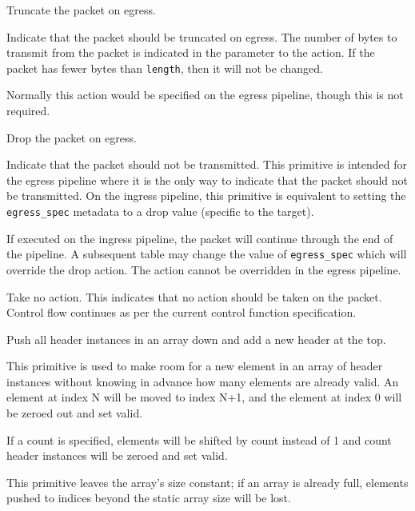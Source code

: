 \documentclass[12pt]{article}
\begin{document}

{ %
Truncate the packet on egress.
}
{ %
}
{ %
Indicate that the packet should be truncated on egress.  The number of bytes 
to transmit from the packet is indicated in the parameter to the action.  If 
the packet has fewer bytes than \texttt{length}, then it will not be changed.

Normally this action would be specified on the egress pipeline, though this 
is not required.
}


{ %
Drop the packet on egress.
}
{ %
}
{ %
Indicate that the packet should not be transmitted. This primitive is intended 
for the egress pipeline where it is the only way to indicate that the packet 
should not be transmitted. On the ingress pipeline, this primitive is equivalent 
to setting the \texttt{egress_spec} metadata to a drop value (specific to the target). 


If executed on the ingress pipeline, the packet will continue through the 
end of the pipeline. A subsequent table may change the value of \texttt{egress_spec} which 
will override the drop action. The action cannot be overridden in the egress 
pipeline.
}


{ %
Take no action.
}
{ %
}
{ %
This indicates that no action should be taken on the packet. Control flow 
continues as per the current control function specification. 
}


{ %
Push all header instances in an array down and add a new header at the top.
}
{ %
}
{ %
This primitive is used to make room for a new element in an array of header
instances without knowing in advance how many elements are already valid. An
element at index N will be moved to index N+1, and the element at index 0 will
be zeroed out and set valid.


If a count is specified, elements will be shifted by count instead of 1 and
count header instances will be zeroed and set valid.


This primitive leaves the array's size constant; if an array is already full,
elements pushed to indices beyond the static array size will be lost.
}
\end{document}
